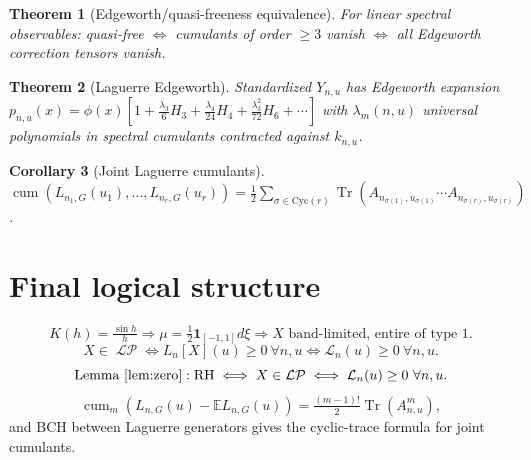 \documentclass[11pt,reqno]{amsart}
\theoremstyle{plain}
\newtheorem{theorem}{Theorem}[section]
\newtheorem{corollary}[theorem]{Corollary}
\theoremstyle{definition}
\theoremstyle{remark}
\DeclareMathOperator{\cum}{cum}
\DeclareMathOperator{\Tr}{Tr}
\DeclareMathOperator{\LP}{\mathcal{LP}}
\newcommand{\Lc}{\mathcal L}
\newcommand{\E}{\mathbb E}
\begin{document}
\begin{theorem}[Edgeworth/quasi-freeness equivalence]\label{thm:edgeworthqf}
For linear spectral observables: quasi-free \(\iff\) cumulants of order
\(\ge3\) vanish \(\iff\) all Edgeworth correction tensors vanish.
\end{theorem}

\begin{theorem}[Laguerre Edgeworth]\label{thm:edgeLag}
Standardized \(Y_{n,u}\) has Edgeworth expansion
\(p_{n,u}(x)=\phi(x)[1+\tfrac{\lambda_3}{6}H_3+\tfrac{\lambda_4}{24}H_4+\tfrac{\lambda_3^2}{72}H_6+\cdots]\)
with \(\lambda_m(n,u)\) universal polynomials in spectral cumulants
contracted against \(k_{n,u}\).
\end{theorem}

\begin{corollary}[Joint Laguerre cumulants]\label{cor:jointcumu}
\(\cum(L_{n_1,G}(u_1),\ldots,L_{n_r,G}(u_r))
=\tfrac12\sum_{\sigma\in\mathrm{Cyc}(r)}\Tr(A_{n_{\sigma(1)},u_{\sigma(1)}}\cdots A_{n_{\sigma(r)},u_{\sigma(r)}})\).
\end{corollary}

\section{Final logical structure}

\[
K(h)=\tfrac{\sin h}{h}\Rightarrow\mu=\tfrac12\mathbf 1_{[-1,1]}d\xi
\Rightarrow X\text{ band-limited, entire of type 1}.
\]
\[
X\in\LP\iff L_n[X](u)\ge0\ \forall n,u\iff\Lc_n(u)\ge0\ \forall n,u.
\]
\[
\text{Lemma \ref{lem:zero}}: \text{RH}\iff X\in\LP\iff\Lc_n(u)\ge0\ \forall n,u.
\]
\[
\cum_m(L_{n,G}(u)-\E L_{n,G}(u))=\tfrac{(m-1)!}{2}\Tr(A_{n,u}^m),
\]
and BCH between Laguerre generators gives the cyclic-trace formula for
joint cumulants.
\end{document}
